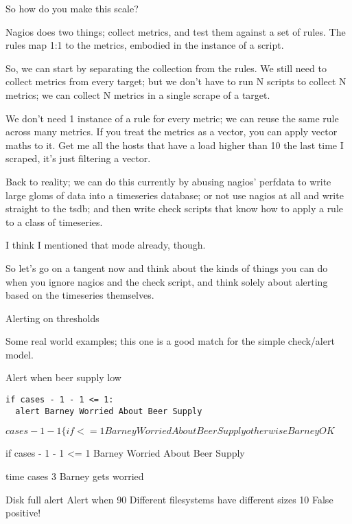 \documentclass[online,12pt,helvetica]{chaksem}
\begin{document}
So how do you make this scale?

Nagios does two things; collect metrics, and test them against a set of rules.
The rules map 1:1 to the metrics, embodied in the instance of a script.

So, we can start by separating the collection from the rules.  We still need to
collect metrics from every target; but we don't have to run N scripts to
collect N metrics; we can collect N metrics in a single scrape of a target.

We don't need 1 instance of a rule for every metric; we can reuse the same rule
across many metrics.  If you treat the metrics as a vector, you can apply
vector maths to it.  Get me all the hosts that have a load higher than 10 the
last time I scraped, it's just filtering a vector.


Back to reality; we can do this currently by abusing nagios' perfdata to write
large gloms of data into a timeseries database; or not use nagios at all and
write straight to the tsdb; and then write check scripts that know how to apply
a rule to a class of timeseries.

I think I mentioned that mode already, though.

So let's go on a tangent now and think about the kinds of things you can do
when you ignore nagios and the check script, and think solely about alerting
based on the timeseries themselves.





Alerting on thresholds

Some real world examples; this one is a good match for the simple check/alert model.


Alert when beer supply low

\begin{verbatim}
if cases - 1 - 1 <= 1:
  alert Barney Worried About Beer Supply
\end{verbatim}

$cases - 1 - 1 {\lbrace  if <= 1 Barney Worried About Beer Supply
 otherwise Barney OK}$


if cases - 1 - 1 <= 1
   Barney Worried About Beer Supply

time
cases
3
Barney gets worried

Disk full alert
Alert when 90%
Different filesystems have different sizes
10%
False positive! 
\end{document}

